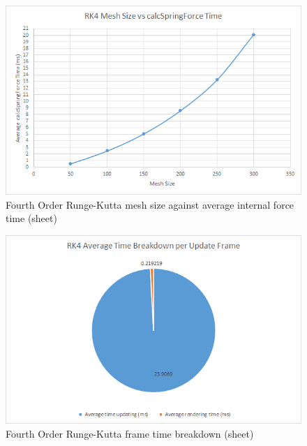     \begin{figure}
    \begin{center}
      \includegraphics[scale=.9]{Figures/sheet_rk4_m_csf}
    \end{center}
    \caption{Fourth Order Runge-Kutta mesh size against average internal force time (sheet)}
    \label{fig:rk4 mesh csf sheet}
  \end{figure}
  
    \begin{figure}
    \begin{center}
      \includegraphics[scale=.9]{Figures/sheet_rk4_ft}
    \end{center}
    \caption{Fourth Order Runge-Kutta frame time breakdown (sheet)}
    \label{fig:rk4 ft sheet}
  \end{figure}
  
